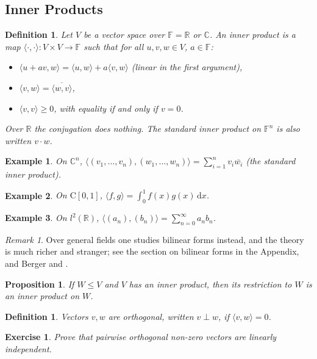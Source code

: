 \documentclass[12pt]{article}
\theoremstyle{breakplain}
\newtheorem{prop}[theorem]{Proposition}
\theoremstyle{breakdef}
\newtheorem{definition}[theorem]{Definition}
\newtheorem*{example}{Example}
\newtheorem{ex}[subsubsection]{Exercise}
\theoremstyle{remark}
\newtheorem*{remark}{Remark}
\begin{document}
\subsection{Inner Products}
\begin{definition}
    Let $V$ be a vector space over $\mathbb{F}=\mathbb{R}$ or $\mathbb{C}$. An \emph{inner product} is a map $\langle\cdot,\cdot\rangle:V\times V \to \mathbb{F}$ such that for all $u,v,w\in V$, $a\in\mathbb{F}$:
    \begin{itemize}
        \item $\langle u+av,w\rangle=\langle u,w\rangle+a\langle v,w\rangle$ (linear in the first argument),
        \item $\langle v,w\rangle=\overline{\langle w,v\rangle}$,
        \item $\langle v,v\rangle\geq 0$, with equality if and only if $v=0$.
    \end{itemize}
    Over $\mathbb{R}$ the conjugation does nothing. The standard inner product on $\mathbb{F}^n$ is also written $v\cdot w$.
\end{definition}
\begin{example}
    On $\mathbb{C}^n$, $\langle (v_1,\ldots ,v_n),(w_1,\dots, w_n)\rangle=\sum_{i=1}^nv_i\overline{w_i}$ (the standard inner product).
\end{example}
\begin{example}
    On $\mathrm{C}[0,1]$, $\langle f,g\rangle=\int_0^1 f(x)g(x)\, \mathrm{d}x$.
\end{example}
\begin{example}
    On $l^2(\mathbb{R})$, $\langle (a_n),(b_n)\rangle=\sum_{n=0}^\infty a_nb_n$.
\end{example}
\begin{remark}
    Over general fields one studies bilinear forms instead, and the theory is much richer and stranger; see the section on bilinear forms in the Appendix, and Berger \cites{Berger1,Berger2} and \cite{Kaplansky}.
\end{remark}
\begin{prop}
    If $W\leq V$ and $V$ has an inner product, then its restriction to $W$ is an inner product on $W$.
\end{prop}
\begin{definition}
    Vectors $v,w$ are \emph{orthogonal}, written $v\perp w$, if $\langle v,w\rangle=0$.
\end{definition}
\begin{ex}
    Prove that pairwise orthogonal non-zero vectors are linearly independent.
\end{ex}
\end{document}

